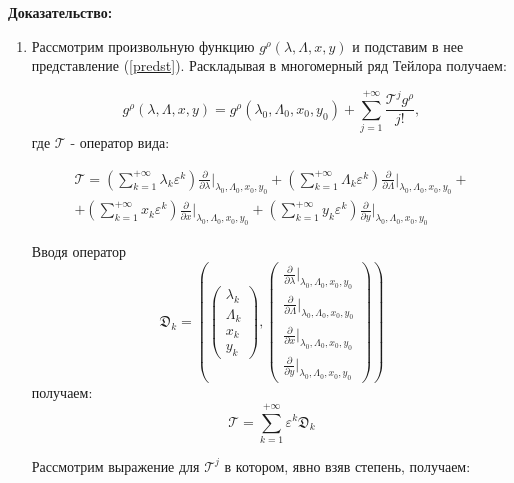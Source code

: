 \textbf{Доказательство:}\nopagebreak[4]

\begin{enumerate}

\item Рассмотрим произвольную функцию $g^\rho(\lambda,\Lambda,x,y)$ и подставим в нее представление (\ref{predst}). Раскладывая в многомерный ряд Тейлора получаем:

$$g^\rho(\lambda,\Lambda,x,y) = g^\rho(\lambda_0,\Lambda_0,x_0,y_0) + \sum_{j=1}^{+\infty} \frac{\mathcal{T}^j g^\rho}{j!},$$
где $\mathcal{T}$ - оператор вида:

\begin{multline*}
\mathcal{T} = 
\left(\sum_{k=1}^{+\infty} \lambda_k \varepsilon^k \right) \frac{\partial}{\partial \lambda} \bigg|_{\lambda_0,\Lambda_0,x_0,y_0}+
\left(\sum_{k=1}^{+\infty} \Lambda_k \varepsilon^k \right) \frac{\partial}{\partial \Lambda} \bigg|_{\lambda_0,\Lambda_0,x_0,y_0}+\\
+\left(\sum_{k=1}^{+\infty} x_k \varepsilon^k \right) \frac{\partial}{\partial x} \bigg|_{\lambda_0,\Lambda_0,x_0,y_0}
+\left(\sum_{k=1}^{+\infty} y_k \varepsilon^k \right) \frac{\partial}{\partial y} \bigg|_{\lambda_0,\Lambda_0,x_0,y_0}
\end{multline*}

Вводя оператор
$$\mathfrak{D}_k = \left( \begin{pmatrix} \lambda_k\\ \Lambda_k \\ x_k \\ y_k \end{pmatrix},\begin{pmatrix} \frac{\partial}{\partial \lambda} |_{\lambda_0,\Lambda_0,x_0,y_0}\\ \frac{\partial}{\partial \Lambda} |_{\lambda_0,\Lambda_0,x_0,y_0} \\ \frac{\partial}{\partial x} |_{\lambda_0,\Lambda_0,x_0,y_0} \\ \frac{\partial}{\partial y} |_{\lambda_0,\Lambda_0,x_0,y_0} \end{pmatrix} \right)$$
получаем:
$$\mathcal{T} = \sum_{k=1}^{+\infty} \varepsilon^k \mathfrak{D}_k$$


Рассмотрим выражение для $\mathcal{T}^j$ в котором, явно взяв степень, получаем:


\end{enumerate}

